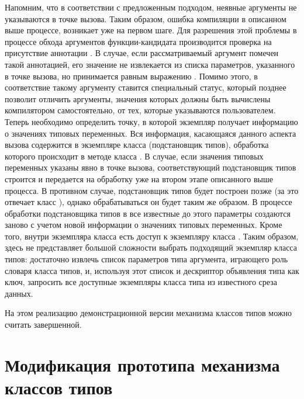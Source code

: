 Напомним, что в соответствии с предложенным подходом, неявные аргументы не указываются в точке вызова. Таким образом, ошибка компиляции в описанном выше процессе, возникает уже на первом шаге. Для разрешения этой проблемы в процессе обхода аргументов функции-кандидата производится проверка на присутствие аннотации . В случае, если рассматриваемый аргумент помечен такой аннотацией, его значение не извлекается из списка параметров, указанного в точке вызова, но принимается равным выражению . Помимо этого, в соответствие такому аргументу ставится специальный статус, который позднее позволит отличить аргументы, значения которых должны быть вычислены компилятором самостоятельно, от тех, которые указываются пользователем. Теперь необходимо определить точку, в которой экземпляр  получает информацию о значениях типовых переменных. Вся информация, касающаяся данного аспекта вызова содержится в экземпляре класса  (подстановщик типов), обработка которого происходит в методе  класса . В случае, если значения типовых переменных указаны явно в точке вызова, соответствующий подстановщик типов строится и передается на обработку уже на втором этапе описанного выше процесса. В противном случае, подстановщик типов будет построен позже (за это отвечает класс ), однако обрабатываться он будет таким же образом. В процессе обработки подстановщика типов в  все известные до этого параметры создаются заново с учетом новой информации о значениях типовых переменных. Кроме того, внутри экземпляра класса  есть доступ к экземпляру класса . Таким образом, здесь не представляет большой сложности выбрать подходящий экземпляр класса типов: достаточно извлечь список параметров типа аргумента, играющего роль словаря класса типов, и, используя этот список и дескриптор объявления типа как ключ, запросить все доступные экземпляры класса типа из известного среза данных.    

На этом реализацию демонстрационной версии механизма классов типов можно считать завершенной. 

\section{Модификация прототипа механизма классов типов}


